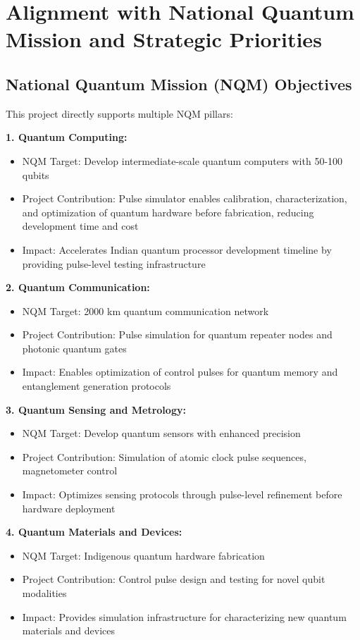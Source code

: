 \documentclass[12pt,a4paper]{article}
\begin{document}
\newpage

\section{Alignment with National Quantum Mission and Strategic Priorities}

\subsection{National Quantum Mission (NQM) Objectives}

This project directly supports multiple NQM pillars:

\textbf{1. Quantum Computing:}
\begin{itemize}[noitemsep]
\item NQM Target: Develop intermediate-scale quantum computers with 50-100 qubits
\item Project Contribution: Pulse simulator enables calibration, characterization, and optimization of quantum hardware before fabrication, reducing development time and cost
\item Impact: Accelerates Indian quantum processor development timeline by providing pulse-level testing infrastructure
\end{itemize}

\textbf{2. Quantum Communication:}
\begin{itemize}[noitemsep]
\item NQM Target: 2000 km quantum communication network
\item Project Contribution: Pulse simulation for quantum repeater nodes and photonic quantum gates
\item Impact: Enables optimization of control pulses for quantum memory and entanglement generation protocols
\end{itemize}

\textbf{3. Quantum Sensing and Metrology:}
\begin{itemize}[noitemsep]
\item NQM Target: Develop quantum sensors with enhanced precision
\item Project Contribution: Simulation of atomic clock pulse sequences, magnetometer control
\item Impact: Optimizes sensing protocols through pulse-level refinement before hardware deployment
\end{itemize}

\textbf{4. Quantum Materials and Devices:}
\begin{itemize}[noitemsep]
\item NQM Target: Indigenous quantum hardware fabrication
\item Project Contribution: Control pulse design and testing for novel qubit modalities
\item Impact: Provides simulation infrastructure for characterizing new quantum materials and devices
\end{itemize}
\end{document}
